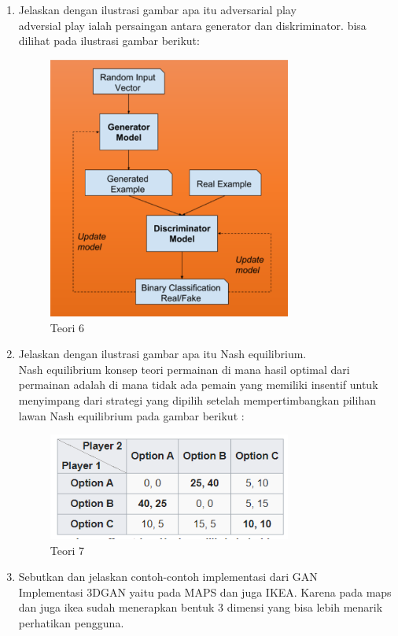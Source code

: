 \begin{enumerate}
\item Jelaskan dengan ilustrasi gambar apa itu adversarial play
	\hfill\\
	adversial play ialah persaingan antara generator dan diskriminator. bisa dilihat pada ilustrasi gambar berikut:
	
\begin{figure}[H]
    \includegraphics[width=8cm]{figures/1174076/figures8/teori6.png}
    \centering
    \caption{Teori 6}
\end{figure}

\item Jelaskan dengan ilustrasi gambar apa itu Nash equilibrium.
	\hfill\\
	Nash equilibrium konsep teori permainan di mana hasil optimal dari permainan adalah di mana tidak ada pemain yang memiliki insentif untuk menyimpang dari strategi yang dipilih setelah mempertimbangkan pilihan lawan
	Nash equilibrium pada gambar berikut :
		
\begin{figure}[H]
    \includegraphics[width=8cm]{figures/1174076/figures8/teori7.png}
    \centering
    \caption{Teori 7}
\end{figure}

\item Sebutkan dan jelaskan contoh-contoh implementasi dari GAN
	\hfill\\
	Implementasi 3DGAN yaitu pada MAPS dan juga IKEA. Karena pada maps dan juga ikea sudah menerapkan bentuk 3 dimensi yang bisa lebih menarik perhatikan pengguna.
	

\end{enumerate}
